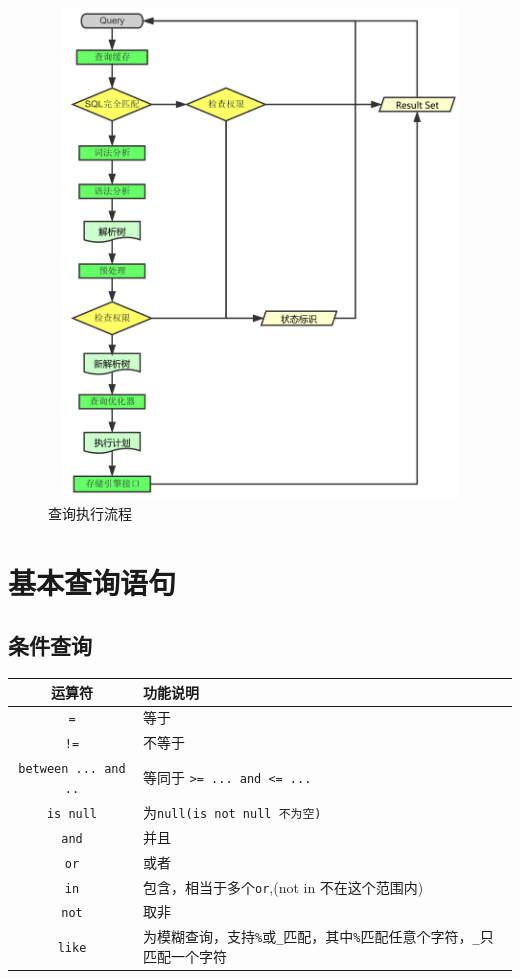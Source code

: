 \documentclass[UTF8,a4paper,12pt]{ctexbook}
\begin{document}
			\begin{figure}[H]
				\centering
				\includegraphics[width=17cm,height=13cm]{mysqlProcess}
				\caption{查询执行流程}
			\end{figure}
			
	\section{基本查询语句}
		\subsection{条件查询}
				\begin{table}[H]
					\centering
					\caption{查询符号}
					\begin{longtable}{c|m{10cm}}
						\hline
						运算符   &   功能说明\\
						\hline
						\verb|=| &  等于 \\
						\verb|!=| & 不等于 \\
						\verb|between ... and ..| & 等同于 \verb|>= ... and <= ...| \\
						\verb|is null| & 为\verb|null(is not null 不为空)| \\
						\verb|and| & 并且 \\
						\verb|or| & 或者\\
						\verb|in| & 包含，相当于多个\verb|or|,(not in 不在这个范围内)\\
						\verb|not| & 取非\\
						\verb|like| & 为模糊查询，支持\verb|%|或\verb|_|匹配，其中\verb|%|匹配任意个字符，\verb|_|只匹配一个字符\\
						\hline	
					\end{longtable}
				\end{table}
				
\end{document}
